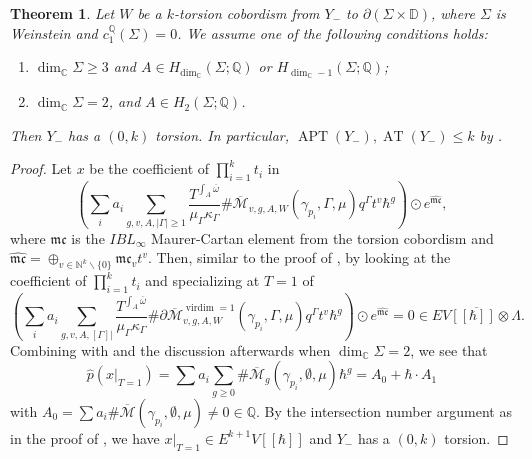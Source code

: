 \documentclass[11pt]{amsart}
\numberwithin{equation}{section}
\newtheorem{theorem}{\textbf{Theorem}}[section]
\def\N{{\mathbb N}}
\def\C{{\mathbb C}}
\def\D{{\mathbb D}}
\def\Q{{\mathbb Q}}
\def\cM{{\mathcal M}}
\def\mc{{\mathfrak {mc}}}
\DeclareMathOperator{\virdim}{virdim}
\DeclareMathOperator{\APT}{APT}
\DeclareMathOperator{\AT}{AT}
\begin{document}
\begin{theorem}\label{thm:finite_AT_k}
    Let $W$ be a $k$-torsion cobordism from $Y_-$ to $\partial(\Sigma \times \D)$, where $\Sigma$ is Weinstein and $c_1^{\Q}(\Sigma)=0$. We assume one of the following conditions holds:
    \begin{enumerate}
        \item\label{AT1} $\dim_{\C}\Sigma \ge 3$ and $A\in H_{\dim_{\C}}(\Sigma;\Q)$ or $H_{\dim_{\C}-1}(\Sigma;\Q)$;
        \item\label{AT2} $\dim_{\C}\Sigma = 2$, and $A\in H_{2}(\Sigma;\Q)$.
    \end{enumerate}
    Then $Y_-$ has a $(0,k)$ torsion. In particular, $\APT(Y_-),\AT(Y_-)\le k$ by .
\end{theorem}
\begin{proof}
     Let $x$ be the coefficient of $\prod_{i=1}^k t_i$ in 
    $$\left(\sum_i a_i \sum_{g, v, A,|\Gamma|\ge 1} \frac{T^{\int_A \overline{\omega}}}{\mu_{\Gamma}\kappa_{\Gamma}}\#\overline{\cM}_{v,g,A,W}(\gamma_{p_i},\Gamma, \mu)q^{\Gamma}t^v\hbar^g\right)\odot e^{\hat{\mc}},$$
    where $\mc$ is the $IBL_\infty$ Maurer-Cartan element from the torsion cobordism and $\hat{\mc}=\oplus_{v\in \N^k\backslash \{0\}}\mc_vt^v$. Then, similar to the proof of , by looking at the coefficient of $\prod_{i=1}^kt_i$ and specializing at $T=1$ of 
    $$\left(\sum_i a_i \sum_{g,v, A, [\Gamma]|} \frac{T^{\int_A \overline{\omega}}}{\mu_{\Gamma}\kappa_{\Gamma}}\#\partial\overline{\cM}^{\virdim =1}_{v,g,A,W}(\gamma_{p_i},\Gamma, \mu)q^{\Gamma}t^v\hbar^g\right)\odot e^{\hat{\mc}}=0\in \overline{EV[[\hbar]]\otimes \Lambda}.$$
    Combining with  and the discussion afterwards when $\dim_{\C}\Sigma =2$, we see that 
    $$\widehat{p}(x|_{T=1})=\sum a_i \sum_{g\ge 0}\#\overline{\cM}_g(\gamma_{p_i},\emptyset,\mu)\hbar^g=A_0+\hbar\cdot A_1$$
    with $A_0=\sum a_i \#\overline{\cM}(\gamma_{p_i},\emptyset,\mu)\ne 0\in \Q$. By the intersection number argument as in the proof of , we have $x|_{T=1}\in E^{k+1}V[[\hbar]]$ and $Y_-$ has a $(0,k)$ torsion. 
\end{proof}
\end{document}
